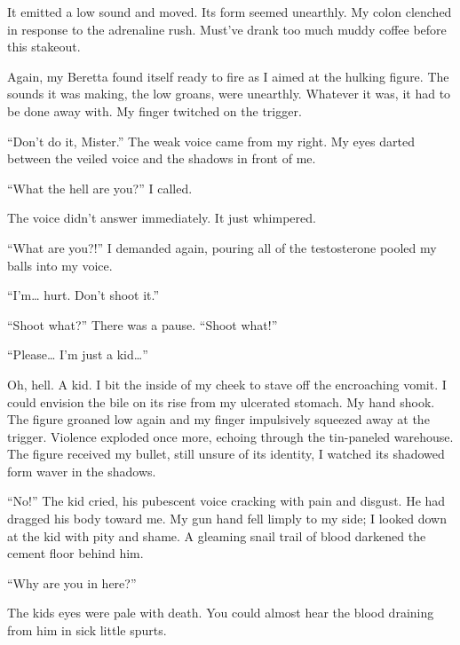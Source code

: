 It emitted a low sound and moved. Its form seemed unearthly. My
colon clenched in response to the adrenaline rush. Must've drank
too much muddy coffee before this stakeout.



Again, my Beretta found itself ready to fire as I aimed at the
hulking figure. The sounds it was making, the low groans, were
unearthly. Whatever it was, it had to be done away with. My finger
twitched on the trigger.



``Don't do it, Mister.'' The weak voice came from my
right. My eyes darted between the veiled voice and the shadows in
front of me.



``What the hell are you?'' I called.



The voice didn't answer immediately. It just whimpered.



``What are you?!'' I demanded again, pouring all of the
testosterone pooled my balls into my voice.



``I'm{\ldots} hurt. Don't shoot it.''



``Shoot what?'' There was a pause. ``Shoot
what!''



``Please{\ldots} I'm just a kid{\ldots}''



Oh, hell. A kid. I bit the inside of my cheek to stave off the
encroaching vomit. I could envision the bile on its rise from my
ulcerated stomach. My hand shook. The figure groaned low again and
my finger impulsively squeezed away at the trigger. Violence
exploded once more, echoing through the tin-paneled warehouse. The
figure received my bullet, still unsure of its identity, I watched
its shadowed form waver in the shadows.



``No!'' The kid cried, his pubescent voice cracking with
pain and disgust. He had dragged his body toward me. My gun hand
fell limply to my side; I looked down at the kid with pity and
shame. A gleaming snail trail of blood darkened the cement floor
behind him.



``Why are you in here?''



The kids eyes were pale with death. You could almost hear the blood
draining from him in sick little spurts.



